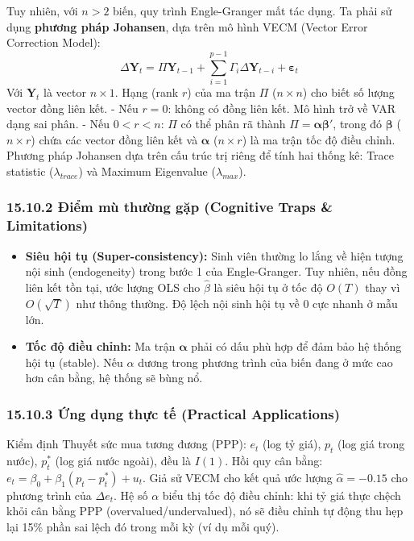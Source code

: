 \documentclass[
]{article}
\providecommand{\tightlist}{%
  \setlength{\itemsep}{0pt}\setlength{\parskip}{0pt}}
\begin{document}
Tuy nhiên, với \(n > 2\) biến, quy trình Engle-Granger mất tác dụng. Ta
phải sử dụng \textbf{phương pháp Johansen}, dựa trên mô hình VECM
(Vector Error Correction Model):
\[ \Delta \mathbf{Y}_t = \Pi \mathbf{Y}_{t-1} + \sum_{i=1}^{p-1} \Gamma_i \Delta \mathbf{Y}_{t-i} + \mathbf{\varepsilon}_t \]
Với \(\mathbf{Y}_t\) là vector \(n \times 1\). Hạng (rank \(r\)) của ma
trận \(\Pi\) (\(n \times n\)) cho biết số lượng vector đồng liên kết. -
Nếu \(r = 0\): không có đồng liên kết. Mô hình trở về VAR dạng sai phân.
- Nếu \(0 < r < n\): \(\Pi\) có thể phân rã thành
\(\Pi = \mathbf{\alpha} \mathbf{\beta}'\), trong đó \(\mathbf{\beta}\)
(\(n \times r\)) chứa các vector đồng liên kết và \(\mathbf{\alpha}\)
(\(n \times r\)) là ma trận tốc độ điều chỉnh. Phương pháp Johansen dựa
trên cấu trúc trị riêng để tính hai thống kê: Trace statistic
(\(\lambda_{trace}\)) và Maximum Eigenvalue (\(\lambda_{max}\)).

\subsubsection{15.10.2 Điểm mù thường gặp (Cognitive Traps \&
Limitations)}\label{ux111iux1ec3m-muxf9-thux1b0ux1eddng-gux1eb7p-cognitive-traps-limitations-107}

\begin{itemize}
\tightlist
\item
  \textbf{Siêu hội tụ (Super-consistency):} Sinh viên thường lo lắng về
  hiện tượng nội sinh (endogeneity) trong bước 1 của Engle-Granger. Tuy
  nhiên, nếu đồng liên kết tồn tại, ước lượng OLS cho \(\hat{\beta}\) là
  siêu hội tụ ở tốc độ \(O(T)\) thay vì \(O(\sqrt{T})\) như thông
  thường. Độ lệch nội sinh hội tụ về 0 cực nhanh ở mẫu lớn.
\item
  \textbf{Tốc độ điều chỉnh:} Ma trận \(\mathbf{\alpha}\) phải có dấu
  phù hợp để đảm bảo hệ thống hội tụ (stable). Nếu \(\alpha\) dương
  trong phương trình của biến đang ở mức cao hơn cân bằng, hệ thống sẽ
  bùng nổ.
\end{itemize}

\subsubsection{15.10.3 Ứng dụng thực tế (Practical
Applications)}\label{ux1ee9ng-dux1ee5ng-thux1ef1c-tux1ebf-practical-applications-63}

Kiểm định Thuyết sức mua tương đương (PPP): \(e_t\) (log tỷ giá),
\(p_t\) (log giá trong nước), \(p^*_t\) (log giá nước ngoài), đều là
\(I(1)\). Hồi quy cân bằng:
\(e_t = \beta_0 + \beta_1 (p_t - p^*_t) + u_t\). Giả sử VECM cho kết quả
ước lượng \(\hat{\alpha} = -0.15\) cho phương trình của \(\Delta e_t\).
Hệ số \(\alpha\) biểu thị tốc độ điều chỉnh: khi tỷ giá thực chệch khỏi
cân bằng PPP (overvalued/undervalued), nó sẽ điều chỉnh tự động thu hẹp
lại 15\% phần sai lệch đó trong mỗi kỳ (ví dụ mỗi quý).
\end{document}
